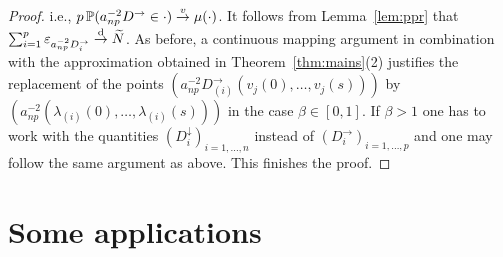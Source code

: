 \begin{proof}
i.e., $
 p \, \P(a_{np}^{-2} D^\rightarrow\in \cdot ) \stackrel{v}{\rightarrow} \mu(\cdot)$.
It follows from Lemma~\ref{lem:ppr} that
$\sum_{i=1}^p\vep_{a_{np}^{-2} D_i^\rightarrow}\std \widetilde{N}$. As before,
a continuous mapping argument in combination with
the approximation obtained in Theorem~\ref{thm:mains}(2)
justifies the replacement of the points $(a_{np}^{-2} D_{(i)}^\rightarrow(v_j(0),\ldots,v_j(s)))$ by
$(a_{np}^{-2} (\lambda_{(i)}(0),\ldots,\lambda_{(i)}(s)))$ in the case $\beta\in [0,1]$. If $\beta>1$ one has to work with the
quantities $(D_i^\downarrow)_{i=1,\ldots,n}$ instead of  $(D_i^\rightarrow)_{i=1,\ldots,p}$ and one may follow the same argument as above.
This finishes the proof.
\end{proof}

\section{Some applications}\setcounter{equation}{0}
